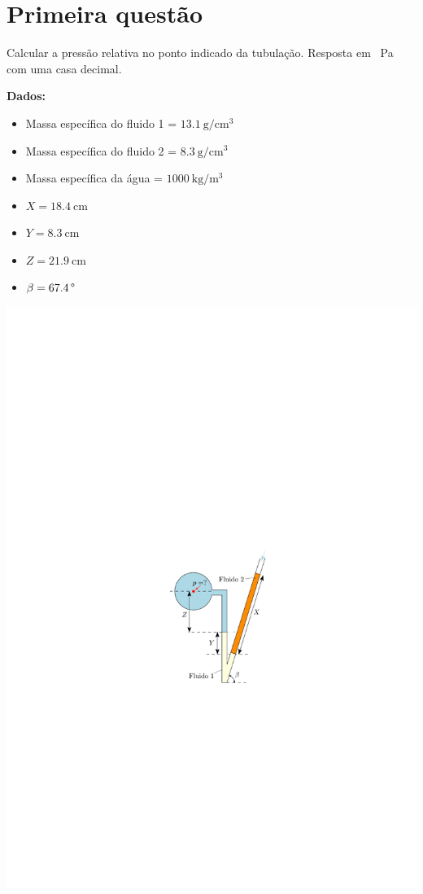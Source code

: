 \documentclass[
	a4paper,
	12pt,
	brazilian
]{article}
\begin{document}
	\section{Primeira questão}
	Calcular a pressão relativa no ponto indicado da tubulação. Resposta em \SI{}{\pascal} com uma casa decimal.\\\vspace{.5cm}
	
	\textbf{Dados:}
	\begin{itemize}
		\item Massa específica do fluido 1 = $\SI{13.1}{\gram/\centi\meter^{3}}$
		\item Massa específica do fluido 2 = $\SI{8.3}{\gram/\centi\meter^{3}}$
		\item Massa específica da água = $\SI{1000}{\kilogram/\meter^{3}}$
		\item $X=\SI{18.4}{\centi\meter}$
		\item $Y=\SI{8.3}{\centi\meter}$
		\item $Z=\SI{21.9}{\centi\meter}$
		\item $\beta=\SI{67.4}{\SIUnitSymbolDegree}$
	\end{itemize}
	\vspace{-8cm}
	\begin{flushright}
			\includegraphics[width=0.4\linewidth]{assets/images/ex1}
	\end{flushright}
\end{document}
